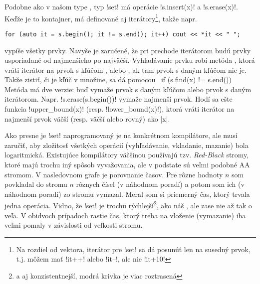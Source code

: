 Podobne ako v našom type , typ \prg!set! má
operácie \prg!s.insert(x)! a \prg!s.erase(x)!. Keďže je to kontajner, má 
definované aj iterátory\footnote{Na rozdiel od vektora, iterátor pre \prg!set! sa
dá posunúť len na susedný prvok, t.j. môžem mať \prg!it++! alebo \prg!it--!, ale 
nie \prg!it+10!}, takže napr.

\begin{lstlisting}
for (auto it = s.begin(); it != s.end(); it++) cout << *it << " ";
\end{lstlisting}

vypíše všetky prvky. Navyše je zaručené, že pri prechode iterátorom
budú prvky usporiadané od najmenšieho po najväčší. Vyhľadávanie prvku robí
metóda , ktorá vráti iterátor na prvok s kľúčom , 
alebo , ak tam 
prvok s daným kľúčom nie je.
Takže zistiť, či je kľúč  v množine, sa dá pomocou \prg~if (s.find(x) != s.end())~
Metóda  má dve verzie: buď vymaže prvok s daným kľúčom alebo prvok s
daným iterátorom. Napr. \prg!s.erase(s.begin())! vymaže najmenší prvok.
Hodí sa ešte funkcia \prg!upper_bound(x)! (resp. \prg!lower_bound(x)!), ktorá vráti
iterátor na najmenší prvok väčší (resp. väčší alebo rovný) ako \prg|x|.


Ako presne je \prg!set! naprogramovaný je na konkrétnom kompilátore, ale musí zaručiť,
aby zložitosť všetkých operácií (vyhľadávanie, vkladanie, mazanie) bola logaritmická.
Existujúce kompilátory väčšinou používajú
tzv. {\em Red-Black} stromy, ktoré majú trochu iný spôsob vyvažovania, ale v podstate
sú veľmi podobné AA stromom. 
V nasledovnom grafe je porovnanie časov. Pre rôzne hodnoty $n$ som
povkladal do stromu $n$ rôznych čísel (v náhodnom poradí) a potom som ich (v náhodnom poradí)
zo stromu vymazal. Meral som si priemerný čas, ktorý trvala jedna operácia. Vidno, že
\prg!set! je trochu rýchlejší\footnote{a aj konzistentnejší, modrá krivka je viac roztrasená}, 
ako náš , ale zase nie až tak o veľa. V obidvoch
prípadoch rastie čas, ktorý treba na vloženie (vymazanie) iba veľmi pomaly 
v závislosti od veľkosti stromu.








